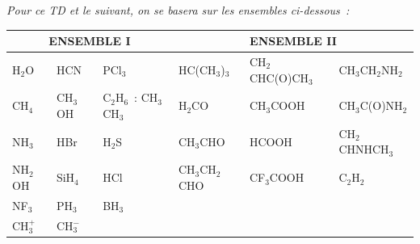 
\begin{center}
\textit{Pour ce TD et le suivant, on se basera sur les ensembles ci-dessous~:}

\vrule

%
%

\begin{tabular}{lll|lll}
\hline
\multicolumn{3}{c|}{\textbf{ENSEMBLE I}}            & \multicolumn{3}{c}{\textbf{ENSEMBLE II}}\\
\hline                                               
H$_2$O      & HCN      & PCl$_3$                   & HC(CH$_3$)$_3$   & CH$_2$CHC(O)CH$_3$ & CH$_3$CH$_2$NH$_2$   \\
CH$_4$      & CH$_3$OH & C$_2$H$_6$~: CH$_3$CH$_3$ & H$_2$CO          & CH$_3$COOH         & CH$_3$C(O)NH$_2$     \\
NH$_3$      & HBr      & H$_2$S                    & CH$_3$CHO        & HCOOH              & CH$_2$CHNHCH$_3$     \\
NH$_2$OH    & SiH$_4$  & HCl                       & CH$_3$CH$_2$CHO  & CF$_3$COOH         & C$_2$H$_2$           \\
NF$_3$      & PH$_3$   & BH$_3$                    & &&\\
CH$_3^+$    & CH$_3^-$ &                           & &&\\
\hline
\end{tabular}

\vrule
\end{center}

